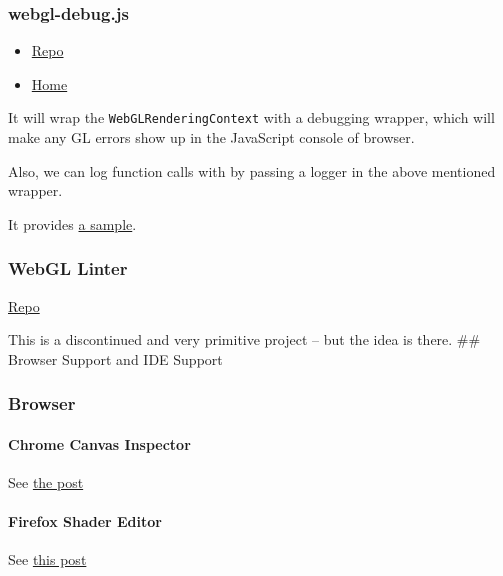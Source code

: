 \documentclass[]{article}
\begin{document}
\subsubsection{webgl-debug.js}\label{webgl-debug.js}

\begin{itemize}
\itemsep1pt\parskip0pt
\item
  \href{https://github.com/KhronosGroup/WebGLDeveloperTools}{Repo}
\item
  \href{https://www.khronos.org/webgl/wiki/Debugging}{Home}
\end{itemize}

It will wrap the \texttt{WebGLRenderingContext} with a debugging
wrapper, which will make any GL errors show up in the JavaScript console
of browser.

Also, we can log function calls with by passing a logger in the above
mentioned wrapper.

It provides
\href{https://github.com/KhronosGroup/WebGLDeveloperTools/blob/master/src/debug/debug-sample.html}{a
sample}.

\subsubsection{WebGL Linter}\label{webgl-linter}

\href{https://github.com/CharlesLillo/WebGL_Linter}{Repo}

This is a discontinued and very primitive project -- but the idea is
there. \#\# Browser Support and IDE Support

\subsubsection{Browser}\label{browser}

\paragraph{Chrome Canvas Inspector}\label{chrome-canvas-inspector}

See
\href{http://learningthreejs.com/blog/2013/04/05/debugging-with-chromes-canvas-inspection/}{the
post}

\paragraph{Firefox Shader Editor}\label{firefox-shader-editor}

See
\href{https://hacks.mozilla.org/2013/11/live-editing-webgl-shaders-with-firefox-developer-tools/}{this
post}
\end{document}
